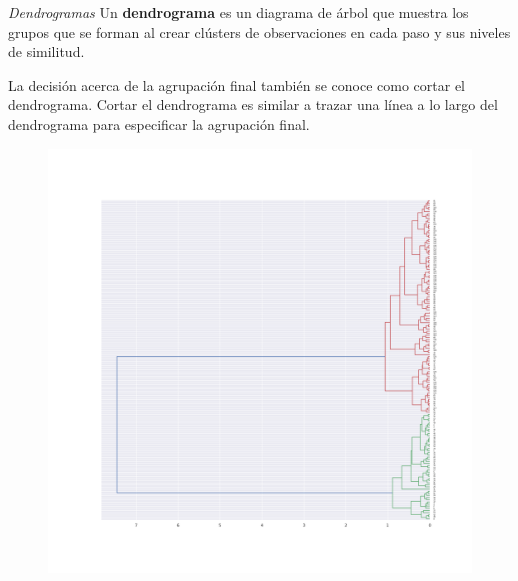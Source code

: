 \documentclass[spanish]{beamer}
\begin{document}
\begin{frame}{\textit{Dendrogramas}}
Un \textbf{dendrograma} es un diagrama de árbol que muestra los grupos que se forman al crear clústers de observaciones en cada paso y sus niveles de similitud.\break

La decisión acerca de la agrupación final también se conoce como cortar el dendrograma. Cortar el dendrograma es similar a trazar una línea a lo largo del dendrograma para especificar la agrupación final.
\end{frame}

\begin{frame}
\begin{figure}[h]
\centering
\includegraphics[scale=0.24]{dani/dendrogramAggClusterIRIS.png}
\end{figure}
\end{frame}
\end{document}
